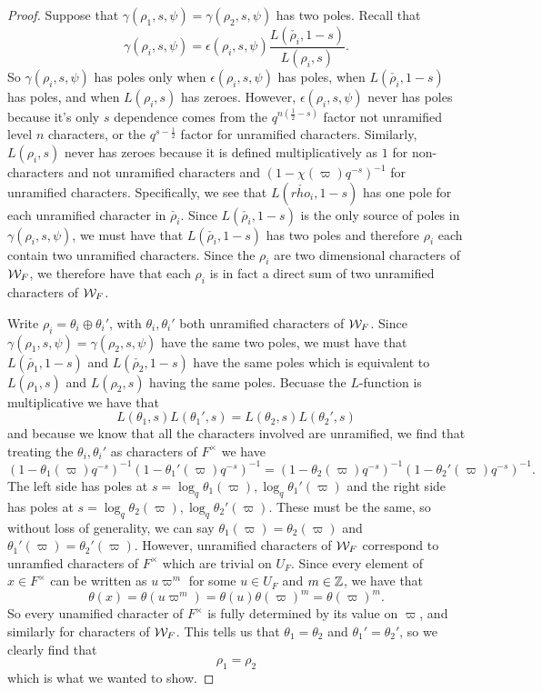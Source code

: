 \begin{proof}
  Suppose that $\gamma(\rho_1,s,\psi) = \gamma(\rho_2,s,\psi)$ has two poles.
  Recall that
  \[\gamma(\rho_i,s,\psi) = \epsilon(\rho_i,s,\psi) \frac{L(\check{\rho_i},1-s)}{L(\rho_i,s)}.\]
  So $\gamma(\rho_i,s,\psi)$ has poles only when $\epsilon(\rho_i,s,\psi)$ has poles, when $L(\check{\rho_i},1-s)$ has poles, and when $L(\rho_i,s)$ has zeroes.
  However, $\epsilon(\rho_i,s,\psi)$ never has poles because it's only $s$ dependence comes from the $q^{n(\frac{1}{2}-s)}$ factor not unramified level $n$ characters, or the $q^{s - \frac{1}{2}}$ factor for unramified characters.
  Similarly, $L(\rho_i,s)$ never has zeroes because it is defined multiplicatively as $1$ for non-characters and not unramified characters and $(1 - \chi(\varpi)q^{-s})^{-1}$ for unramified characters.
  Specifically, we see that $L(\check{rho_i},1-s)$ has one pole for each unramified character in $\check{\rho_i}$.
  Since $L(\check{\rho_i}, 1-s)$ is the only source of poles in $\gamma(\rho_i,s,\psi)$, we must have that $L(\check{\rho_i},1-s)$ has two poles and therefore $\rho_i$ each contain two unramified characters.
  Since the $\rho_i$ are two dimensional characters of $\mathcal{W}_F$, we therefore have that each $\rho_i$ is in fact a direct sum of two unramified characters of $\mathcal{W}_F$.

  Write $\rho_i = \theta_i \oplus \theta_i'$, with $\theta_i, \theta_i'$ both unramified characters of $\mathcal{W}_F$.
  Since $\gamma(\rho_1,s,\psi) = \gamma(\rho_2,s,\psi)$ have the same two poles, we must have that $L(\check{\rho_1},1-s)$ and $L(\check{\rho_2},1-s)$ have the same poles which is equivalent to $L(\rho_1,s)$ and $L(\rho_2,s)$ having the same poles.
  Becuase the $L$-function is multiplicative we have that
  \[L(\theta_1,s)L(\theta_1',s) = L(\theta_2,s)L(\theta_2',s)\]
  and because we know that all the characters involved are unramified, we find that treating the $\theta_i,\theta_i'$ as characters of $F^\times$ we have
  \[(1 - \theta_1(\varpi)q^{-s})^{-1}(1 - \theta_1'(\varpi)q^{-s})^{-1} = (1 - \theta_2(\varpi)q^{-s})^{-1}(1 - \theta_2'(\varpi)q^{-s})^{-1}.\]
  The left side has poles at $s = \log_q \theta_1(\varpi), \log_q \theta_1'(\varpi)$ and the right side has poles at $s = \log_q \theta_2(\varpi), \log_q \theta_2'(\varpi)$.
  These must be the same, so without loss of generality, we can say $\theta_1(\varpi) = \theta_2(\varpi)$ and $\theta_1'(\varpi) = \theta_2'(\varpi)$.
  However, unramified characters of $\mathcal{W}_F$ correspond to unramfied characters of $F^\times$ which are trivial on $U_F$.
  Since every element of $x \in F^\times$ can be written as $u\varpi^m$ for some $u \in U_F$ and $m \in \mathbb{Z}$, we have that
  \[\theta(x) = \theta(u\varpi^m) = \theta(u) \theta(\varpi)^m = \theta(\varpi)^m.\]
  So every unamified character of $F^\times$ is fully determined by its value on $\varpi$, and similarly for characters of $\mathcal{W}_F$.
  This tells us that $\theta_1 = \theta_2$ and $\theta_1' = \theta_2'$, so we clearly find that \[\rho_1 = \rho_2\] which is what we wanted to show.
\end{proof}


